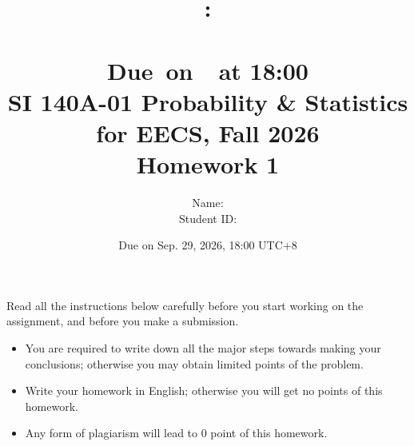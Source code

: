 \documentclass[a4paper]{article}
\title{
    \vspace{2in}
    \textmd{\textbf{\hmwkClass:\\  \hmwkTitle}}\\
    \normalsize\vspace{0.1in}\small{Due\ on\ \hmwkDueDate\ at 18:00}\\
	\vspace{4in}
}
\author{
	Name: \textbf{\hmwkAuthorName} \\
	Student ID: \hmwkAuthorID}
\date{}
\begin{document}

\date{
Due on Sep. 29, 2026, 18:00 UTC+8}
\title{SI 140A-01  Probability \& Statistics for EECS, Fall 2026 \\
Homework 1}
\maketitle
Read all the instructions below carefully before you start working on the assignment, and before you make a submission.
\begin{itemize}
    \item You are required to write down all the major steps towards making your conclusions; otherwise you may obtain limited points of the problem.
    \item Write your homework in English; otherwise you will get no points of this homework.
    \item Any form of plagiarism will lead to $0$ point of this homework. 
\end{itemize}
\newpage
\end{document}
